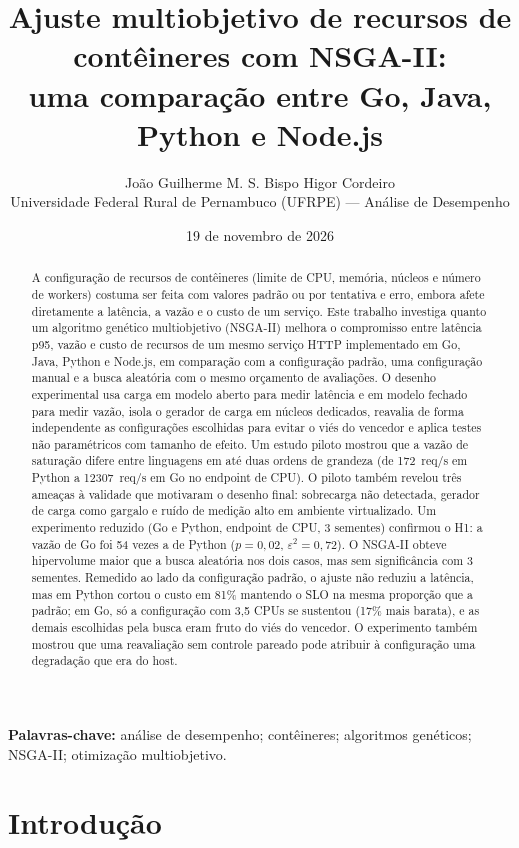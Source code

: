 \documentclass[11pt,a4paper]{article}
\title{Ajuste multiobjetivo de recursos de contêineres com NSGA-II:\\
uma comparação entre Go, Java, Python e Node.js}
\author{João Guilherme M. S. Bispo \qquad Higor Cordeiro\\[4pt]
\small Universidade Federal Rural de Pernambuco (UFRPE) --- Análise de Desempenho}
\date{19 de novembro de 2026}
\begin{document}
\maketitle

\begin{abstract}
A configuração de recursos de contêineres (limite de CPU, memória, núcleos e número de workers)
costuma ser feita com valores padrão ou por tentativa e erro, embora afete diretamente a latência,
a vazão e o custo de um serviço. Este trabalho investiga quanto um algoritmo genético multiobjetivo (NSGA-II)
melhora o compromisso entre latência p95, vazão e custo de recursos de um mesmo serviço HTTP implementado em
Go, Java, Python e Node.js, em comparação com a configuração padrão, uma configuração manual e a busca aleatória
com o mesmo orçamento de avaliações. O desenho experimental usa carga em modelo aberto para medir latência e em modelo
fechado para medir vazão, isola o gerador de carga em núcleos dedicados, reavalia de forma independente as configurações
escolhidas para evitar o viés do vencedor e aplica testes não paramétricos com tamanho de efeito. Um estudo piloto
mostrou que a vazão de saturação difere entre linguagens em até duas ordens de grandeza (de \SI{172}{req/s} em Python
a \SI{12307}{req/s} em Go no endpoint de CPU). O piloto também revelou três ameaças à validade que motivaram o desenho
final: sobrecarga não detectada, gerador de carga como gargalo e ruído de medição alto em ambiente virtualizado.
Um experimento reduzido (Go e Python, endpoint de CPU, 3 sementes) confirmou o H1: a vazão de Go foi 54 vezes a de
Python ($p = 0{,}02$, $\varepsilon^2 = 0{,}72$). O NSGA-II obteve hipervolume maior que a busca aleatória nos dois casos,
mas sem significância com 3 sementes. Remedido ao lado da configuração padrão, o ajuste não reduziu a latência, mas em
Python cortou o custo em 81\% mantendo o SLO na mesma proporção que a padrão; em Go, só a configuração com 3,5 CPUs se
sustentou (17\% mais barata), e as demais escolhidas pela busca eram fruto do viés do vencedor. O experimento também
mostrou que uma reavaliação sem controle pareado pode atribuir à configuração uma degradação que era do host.
\end{abstract}

\noindent\textbf{Palavras-chave:} análise de desempenho; contêineres; algoritmos genéticos; NSGA-II; otimização multiobjetivo.

\section{Introdução}
\end{document}
